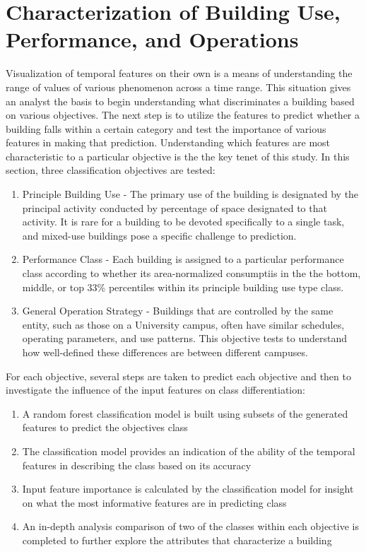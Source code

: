 \section{Characterization of Building Use, Performance, and Operations}
\label{sec:characterization}

Visualization of temporal features on their own is a means of understanding the range of values of various phenomenon across a time range. This situation gives an analyst the basis to begin understanding what discriminates a building based on various objectives. The next step is to utilize the features to predict whether a building falls within a certain category and test the importance of various features in making that prediction. Understanding which features are most characteristic to a particular objective is the the key tenet of this study. In this section, three classification objectives are tested: 

\begin{enumerate}
\item Principle Building Use - The primary use of the building is designated by the principal activity conducted by percentage of space designated to that activity. It is rare for a building to be devoted specifically to a single task, and mixed-use buildings pose a specific challenge to prediction.
\item Performance Class - Each building is assigned to a particular performance class according to whether its area-normalized consumptiis in the the bottom, middle, or top 33\% percentiles within its principle building use type class.
\item General Operation Strategy - Buildings that are controlled by the same entity, such as those on a University campus, often have similar schedules, operating parameters, and use patterns. This objective tests to understand how well-defined these differences are between different campuses.
\end{enumerate}

For each objective, several steps are taken to predict each objective and then to investigate the influence of the input features on class differentiation:
\begin{enumerate}
\item A random forest classification model is built using subsets of the generated features to predict the objectives class
\item The classification model provides an indication of the ability of the temporal features in describing the class based on its accuracy
\item Input feature importance is calculated by the classification model for insight on what the most informative features are in predicting class
\item An in-depth analysis comparison of two of the classes within each objective is completed to further explore the attributes that characterize a building
\end{enumerate}

